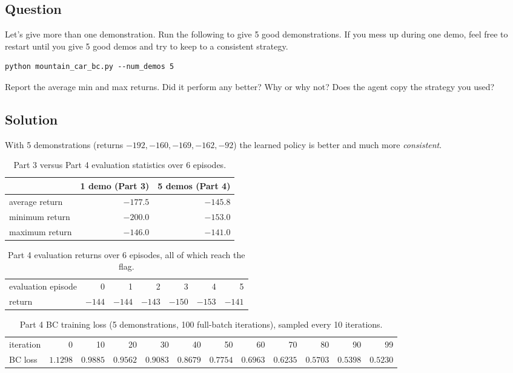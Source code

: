 \documentclass[12pt]{article}%
\begin{document}
\subsection{Question}
Let's give more than one demonstration. Run the following to give 5 good
demonstrations. If you mess up during one demo, feel free to restart until you
give 5 good demos and try to keep to a consistent strategy.
\begin{verbatim}
python mountain_car_bc.py --num_demos 5
\end{verbatim}
Report the average min and max returns. Did it perform any better? Why or why
not? Does the agent copy the strategy you used?

\subsection{Solution}
With 5 demonstrations (returns $-192, -160, -169, -162, -92$) the learned
policy is better and much more \emph{consistent}.

\begin{table}[h]
\centering
\small
\caption{Part 3 versus Part 4 evaluation statistics over 6 episodes.}
\label{tab:p34}
\begin{tabular}{lrr}
\toprule
 & \textbf{1 demo (Part 3)} & \textbf{5 demos (Part 4)} \\
\midrule
average return & $-177.5$ & $\mathbf{-145.8}$ \\
minimum return & $-200.0$ & $\mathbf{-153.0}$ \\
maximum return & $-146.0$ & $\mathbf{-141.0}$ \\
\bottomrule
\end{tabular}
\end{table}
\begin{table}[h]
\centering
\small
\caption{Part 4 evaluation returns over 6 episodes, all of which reach the flag.}
\label{tab:p4eval}
\begin{tabular}{l*{6}{r}}
\toprule
evaluation episode & 0 & 1 & 2 & 3 & 4 & 5 \\
return & $-144$ & $-144$ & $-143$ & $-150$ & $-153$ & $-141$ \\
\bottomrule
\end{tabular}

\end{table}
\begin{table}[h]
\centering
\footnotesize
\setlength{\tabcolsep}{4pt}
\caption{Part 4 BC training loss (5 demonstrations, 100 full-batch iterations), sampled every 10 iterations.}
\label{tab:p4loss}
\begin{tabular}{@{}l*{11}{r}@{}}
\toprule
iteration & 0 & 10 & 20 & 30 & 40 & 50 & 60 & 70 & 80 & 90 & 99 \\
BC loss & $1.1298$ & $0.9885$ & $0.9562$ & $0.9083$ & $0.8679$ & $0.7754$ & $0.6963$ & $0.6235$ & $0.5703$ & $0.5398$ & $0.5230$ \\
\bottomrule
\end{tabular}
\end{table}
\end{document}
